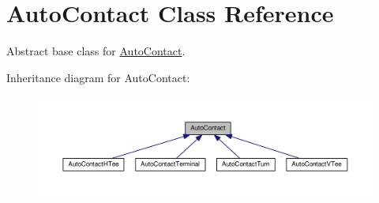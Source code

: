 \hypertarget{classKatabatic_1_1AutoContact}{\section{Auto\-Contact Class Reference}
\label{classKatabatic_1_1AutoContact}
}


Abstract base class for \hyperlink{classKatabatic_1_1AutoContact}{Auto\-Contact}.  




Inheritance diagram for Auto\-Contact\-:\nopagebreak
\begin{figure}[H]
\begin{center}
\leavevmode
\includegraphics[width=350pt]{classKatabatic_1_1AutoContact__inherit__graph}
\end{center}
\end{figure}

